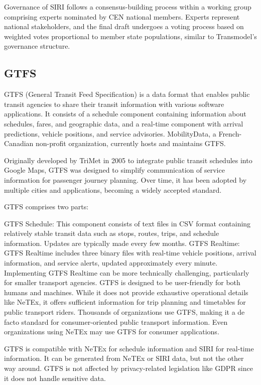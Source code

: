 \documentclass[12pt]{report}
\begin{document}
	Governance of SIRI follows a consensus-building process within a working group comprising experts nominated by CEN national members. Experts represent national stakeholders, and the final draft undergoes a voting process based on weighted votes proportional to member state populations, similar to Transmodel's governance structure.
	
	\subsection{GTFS}
	
	GTFS (General Transit Feed Specification) is a data format that enables public transit agencies to share their transit information with various software applications. It consists of a schedule component containing information about schedules, fares, and geographic data, and a real-time component with arrival predictions, vehicle positions, and service advisories. MobilityData, a French-Canadian non-profit organization, currently hosts and maintains GTFS.
	
	Originally developed by TriMet in 2005 to integrate public transit schedules into Google Maps, GTFS was designed to simplify communication of service information for passenger journey planning. Over time, it has been adopted by multiple cities and applications, becoming a widely accepted standard.
	
	GTFS comprises two parts:
	
	GTFS Schedule: This component consists of text files in CSV format containing relatively stable transit data such as stops, routes, trips, and schedule information. Updates are typically made every few months.
	GTFS Realtime: GTFS Realtime includes three binary files with real-time vehicle positions, arrival information, and service alerts, updated approximately every minute. Implementing GTFS Realtime can be more technically challenging, particularly for smaller transport agencies.
	GTFS is designed to be user-friendly for both humans and machines. While it does not provide exhaustive operational details like NeTEx, it offers sufficient information for trip planning and timetables for public transport riders. Thousands of organizations use GTFS, making it a de facto standard for consumer-oriented public transport information. Even organizations using NeTEx may use GTFS for consumer applications.
	
	GTFS is compatible with NeTEx for schedule information and SIRI for real-time information. It can be generated from NeTEx or SIRI data, but not the other way around. GTFS is not affected by privacy-related legislation like GDPR since it does not handle sensitive data.
	
\end{document}
